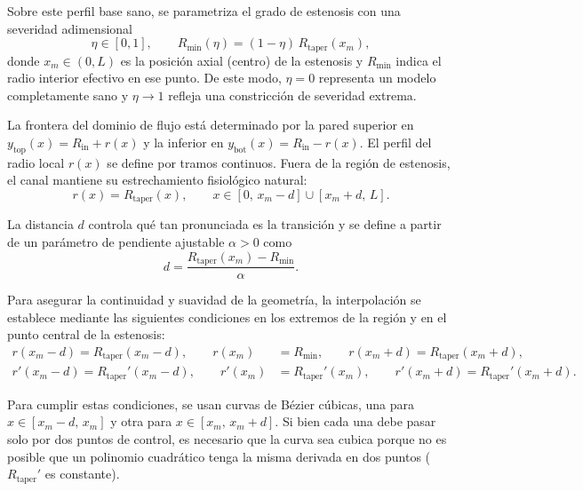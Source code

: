 \documentclass[12pt, letterpaper]{article}
\begin{document}
Sobre este perfil base sano, se parametriza el grado de estenosis con una severidad adimensional
\begin{equation}
  \label{eq:eac_severity}
  \eta \in [0,1],
  \qquad
  R_{\min}(\eta)= (1-\eta)\,R_{\mathrm{taper}}(x_m),
\end{equation}
\noindent donde $x_m \in (0,L)$ es la posición axial (centro) de la estenosis y $R_{\min}$ indica el radio interior efectivo en ese punto. De este modo, $\eta=0$ representa un modelo completamente sano y $\eta\to 1$ refleja una constricción de severidad extrema.

La frontera del dominio de flujo está determinado por la pared superior en $y_{\mathrm{top}}(x) = R_{\mathrm{in}} + r(x)$ y la inferior en $y_{\mathrm{bot}}(x) = R_{\mathrm{in}} - r(x)$. El perfil del radio local $r(x)$ se define por tramos continuos. Fuera de la región de estenosis, el canal mantiene su estrechamiento fisiológico natural:
\begin{equation}
  \label{eq:eac_healthy_segments}
  r(x)=R_{\mathrm{taper}}(x),
  \qquad x\in[0,\,x_m-d]\cup[x_m+d,\,L].
\end{equation}

La distancia $d$ controla qué tan pronunciada es la transición y se define a partir de un parámetro de pendiente ajustable $\alpha>0$ como
\begin{equation}
  \label{eq:eac_d_alpha}
  d = \frac{R_{\mathrm{taper}}(x_m)-R_{\min}}{\alpha}.
\end{equation}

Para asegurar la continuidad y suavidad de la geometría, la interpolación se establece mediante las siguientes condiciones en los extremos de la región y en el punto central de la estenosis:
\begin{align*}
  r(x_m-d)=R_{\mathrm{taper}}(x_m-d),
  \qquad
  r(x_m)&=R_{\min},
  \qquad
  r(x_m+d)=R_{\mathrm{taper}}(x_m+d), \\
  r'(x_m-d)=R_{\mathrm{taper}}'(x_m-d),
  \qquad
  r'(x_m)&=R_{\mathrm{taper}}'(x_m),
  \qquad
  r'(x_m+d)=R_{\mathrm{taper}}'(x_m+d).
\end{align*}

Para cumplir estas condiciones, se usan curvas de Bézier cúbicas, una para $x\in[x_m-d,\,x_m]$ y otra para $x\in[x_m,\,x_m+d]$. Si bien cada una debe pasar solo por dos puntos de control, es necesario que la curva sea cubica porque no es posible que un polinomio cuadrático tenga la misma derivada en dos puntos ($R_{\mathrm{taper}}'$ es constante).
\end{document}

